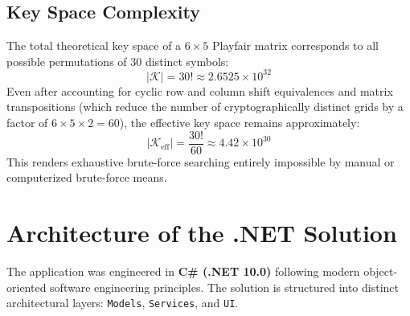 \documentclass[12pt,a4paper]{article}
\begin{document}
\subsection{Key Space Complexity}
The total theoretical key space of a $6 \times 5$ Playfair matrix corresponds to all possible permutations of $30$ distinct symbols:
\begin{equation}
    |\mathcal{K}| = 30! \approx 2.6525 \times 10^{32}
\end{equation}
Even after accounting for cyclic row and column shift equivalences and matrix transpositions (which reduce the number of cryptographically distinct grids by a factor of $6 \times 5 \times 2 = 60$), the effective key space remains approximately:
\begin{equation}
    |\mathcal{K}_{\text{eff}}| = \frac{30!}{60} \approx 4.42 \times 10^{30}
\end{equation}
This renders exhaustive brute-force searching entirely impossible by manual or computerized brute-force means.

\section{Architecture of the .NET Solution}

The application was engineered in \textbf{C\# (.NET 10.0)} following modern object-oriented software engineering principles. The solution is structured into distinct architectural layers: \texttt{Models}, \texttt{Services}, and \texttt{UI}.
\end{document}
